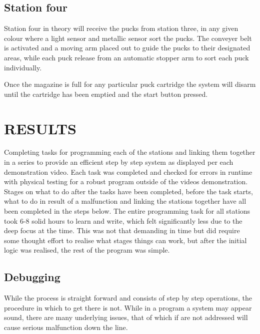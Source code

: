 \documentclass[a4paper, 10pt,  conference]{article}
\begin{document}
\subsection{Station four}
Station four in theory will receive the pucks from station three, in any given colour where a light sensor and metallic sensor sort the pucks. The conveyer belt is activated and a moving arm placed out to guide the pucks to their designated areas, while each puck release from an automatic stopper arm to sort each puck individually. 

Once the magazine is full for any particular puck cartridge the system will disarm until the cartridge has been emptied and the start button pressed.




\section{RESULTS}
Completing tasks for programming each of the stations and linking them together in a series to provide an efficient step by step system as displayed per each demonstration video. Each task was completed and checked for errors in runtime with physical testing for a robust program outside of the videos demonstration. Stages on what to do after  the tasks have been completed, before the task starts, what to do in result of a malfunction and linking the stations together have all been completed in the steps below. The entire programming task for all stations took 6-8 solid hours to learn and write, which felt significantly less due to the deep focus at the time. This was not that demanding in time but did require some thought effort to realise what stages things can work, but after the initial logic was realised, the rest of the program was simple.



\clearpage
\subsection{Debugging} 
While the process is straight forward and consists of step by step operations, the procedure in which to get there is not. While in a program a system may appear sound, there are many underlying issues, that of which if are not addressed will cause serious malfunction down the line. 
\end{document}
